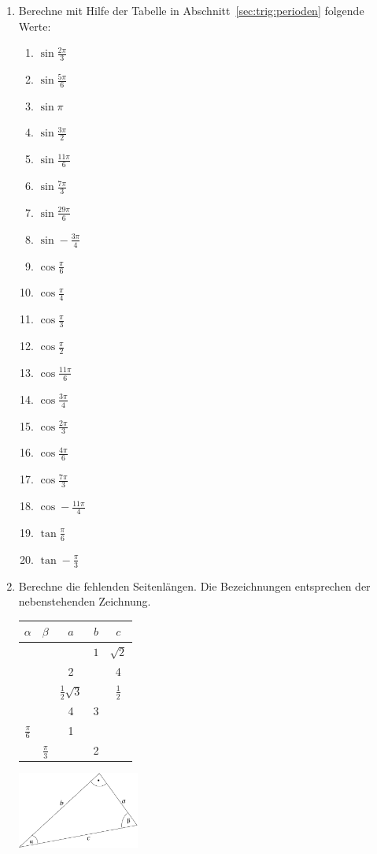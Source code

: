 \begin{enumerate}
 \item Berechne mit Hilfe der Tabelle in Abschnitt~\ref{sec:trig:perioden}
folgende Werte:
 \begin{multicols}{4}
  \begin{enumerate}
   \item $\sin \frac{2\pi}{3}$ 
   \item $\sin \frac{5\pi}{6}$
   \item $\sin \pi$
   \item $\sin \frac{3\pi}{2}$
   \item $\sin \frac{11\pi}{6}$
   \item $\sin \frac{7\pi}{3}$
   \item $\sin \frac{29\pi}{6}$
   \item $\sin -\frac{3\pi}{4}$
   \item $\cos \frac{\pi}{6}$
   \item $\cos \frac{\pi}{4}$
   \item $\cos \frac{\pi}{3}$
   \item $\cos \frac{\pi}{2}$
   \item $\cos \frac{11\pi}{6}$
   \item $\cos \frac{3\pi}{4}$
   \item $\cos \frac{2\pi}{3}$
   \item $\cos \frac{4\pi}{6}$
   \item $\cos \frac{7\pi}{3}$
   \item $\cos -\frac{11\pi}{4}$
   \item $\tan \frac{\pi}{6}$
   \item $\tan -\frac{\pi}{3}$
  \end{enumerate}
 \end{multicols}

\item Berechne die fehlenden Seitenlängen. Die
Bezeichnungen entsprechen der nebenstehenden Zeichnung.

\begin{minipage}{6cm}
\begin{tabular}{|ccccc|}
$\alpha$ & $\beta$ & $a$ & $b$ & $c$\\
\hline
& &  & $1$ & $\sqrt{2}$\\
& & 2 &  & 4\\ %
& & $\frac{1}{2}\sqrt{3}$& & $\frac{1}{2}$\\
& & 4 & 3 & \\
$\frac{\pi}{6}$ & & 1 & &\\
&$\frac{\pi}{3}$ & & 2 &\\
\end{tabular}
\end{minipage}
\begin{minipage}{4cm}\includegraphics[width=4cm]{img/winkel_aufgaben.pdf}
\end{minipage}





\end{enumerate}
